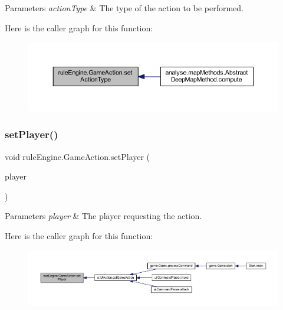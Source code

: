 \begin{DoxyParams}{Parameters}
{\em action\+Type} & The type of the action to be performed. \\
\hline
\end{DoxyParams}
Here is the caller graph for this function\+:
\nopagebreak
\begin{figure}[H]
\begin{center}
\leavevmode
\includegraphics[width=350pt]{classrule_engine_1_1_game_action_a3337a150ac049db623ec6e96dcfa3ff3_icgraph}
\end{center}
\end{figure}
\mbox{\label{classrule_engine_1_1_game_action_a82419831fe1e365ea8a19d1ead0f9046}} 
\subsubsection{\texorpdfstring{set\+Player()}{setPlayer()}}
{\footnotesize\ttfamily void rule\+Engine.\+Game\+Action.\+set\+Player (\begin{DoxyParamCaption}\item[{\mbox{\hyperlink{enumgame_1_1_e_player}{E\+Player}}}]{player }\end{DoxyParamCaption})\hspace{0.3cm}{\ttfamily [inline]}}


\begin{DoxyParams}{Parameters}
{\em player} & The player requesting the action. \\
\hline
\end{DoxyParams}
Here is the caller graph for this function\+:
\nopagebreak
\begin{figure}[H]
\begin{center}
\leavevmode
\includegraphics[width=350pt]{classrule_engine_1_1_game_action_a82419831fe1e365ea8a19d1ead0f9046_icgraph}
\end{center}
\end{figure}
\mbox{\label{classrule_engine_1_1_game_action_a606ab317d79faf03aba37638bdc23cd6}} 
